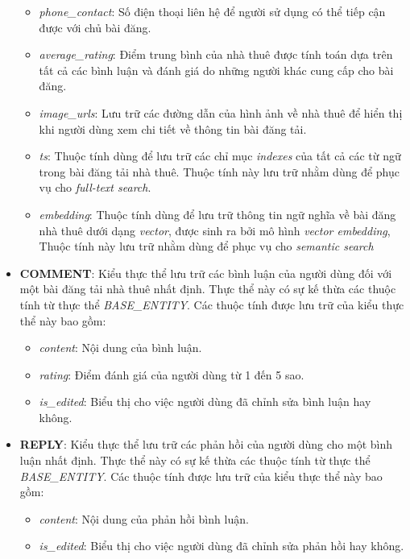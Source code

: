 \begin{itemize}
\begin{itemize}
        \item \textit{phone\_contact}: Số điện thoại liên hệ để người sử dụng có thể tiếp cận được với chủ bài đăng.
        \item \textit{average\_rating}: Điểm trung bình của nhà thuê được tính toán dựa trên tất cả các bình luận và đánh giá do những người khác cung cấp cho bài đăng.
        \item \textit{image\_urls}: Lưu trữ các đường dẫn của hình ảnh về nhà thuê để hiển thị khi người dùng xem chi tiết về thông tin bài đăng tải.
        \item \textit{ts}: Thuộc tính dùng để lưu trữ các chỉ mục \textit{indexes} của tất cả các từ ngữ trong bài đăng tải nhà thuê. Thuộc tính này lưu trữ nhằm dùng để phục vụ cho \textit{full-text search}.
        \item \textit{embedding}: Thuộc tính dùng để lưu trữ thông tin ngữ nghĩa về bài đăng nhà thuê dưới dạng \textit{vector}, được sinh ra bởi mô hình \textit{vector embedding}, Thuộc tính này lưu trữ nhằm dùng để phục vụ cho \textit{semantic search}
    \end{itemize}
    \item \textbf{COMMENT}: Kiểu thực thể lưu trữ các bình luận của người dùng đối với một bài đăng tải nhà thuê nhất định. Thực thể này có sự kế thừa các thuộc tính từ thực thể \textit{BASE\_ENTITY}. Các thuộc tính được lưu trữ của kiểu thực thể này bao gồm:
    \begin{itemize}
        \item \textit{content}: Nội dung của bình luận.
        \item \textit{rating}: Điểm đánh giá của người dùng từ 1 đến 5 sao.
        \item \textit{is\_edited}: Biểu thị cho việc người dùng đã chỉnh sửa bình luận hay không.
    \end{itemize}
    \item \textbf{REPLY}: Kiểu thực thể lưu trữ các phản hồi của người dùng cho một bình luận nhất định. Thực thể này có sự kế thừa các thuộc tính từ thực thể \textit{BASE\_ENTITY}. Các thuộc tính được lưu trữ của kiểu thực thể này bao gồm:
    \begin{itemize}
        \item \textit{content}: Nội dung của phản hồi bình luận.
        \item \textit{is\_edited}: Biểu thị cho việc người dùng đã chỉnh sửa phản hồi hay không.
    \end{itemize}
\end{itemize}

